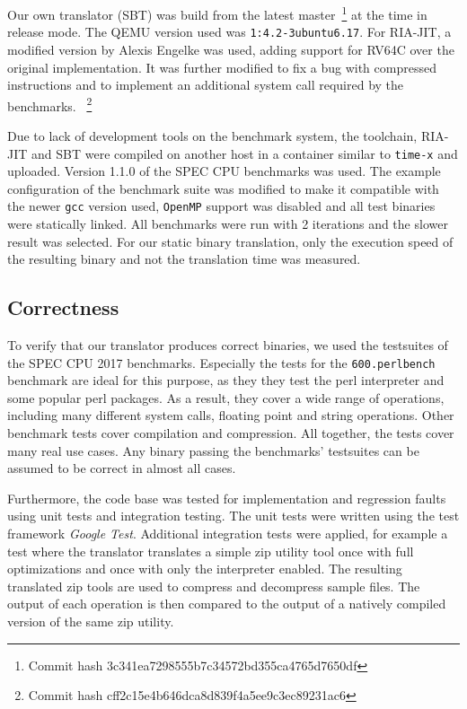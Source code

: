\documentclass[course=eragp]{aspdoc}
\begin{document}
Our own translator (SBT) was build from the latest master~\footnote{Commit hash 3c341ea7298555b7c34572bd355ca4765d7650df} at the time in release mode.
The QEMU version used was \texttt{1:4.2-3ubuntu6.17}.
For RIA-JIT, a modified version by Alexis Engelke was used, adding support for RV64C over the original implementation.
It was further modified to fix a bug with compressed instructions and to implement an additional system call required by the benchmarks.
~\footnote{Commit hash cff2c15e4b646dca8d839f4a5ee9c3ec89231ac6}

\par

Due to lack of development tools on the benchmark system, the toolchain,
RIA-JIT and SBT were compiled on another host in a container similar to \texttt{time-x} and uploaded. %
Version 1.1.0 of the SPEC CPU benchmarks was used.
The example configuration of the benchmark suite was modified to make
it compatible with the newer \texttt{gcc} version used, \texttt{OpenMP} support was disabled and all test binaries were statically linked.
All benchmarks were run with 2 iterations and the slower result was selected.
For our static binary translation, only the execution speed of the resulting binary and not the
translation time was measured.

\subsection{Correctness}

To verify that our translator produces correct binaries, we used the testsuites of the SPEC CPU 2017 benchmarks.
Especially the tests for the \texttt{600.perlbench} benchmark are ideal for this purpose,
as they they test the perl interpreter and some popular perl packages.
As a result, they cover a wide range of operations, including many different system calls,
floating point and string operations.
Other benchmark tests cover compilation and compression.
All together, the tests cover many real use cases. Any binary passing the benchmarks' testsuites can be assumed to be correct in almost all cases.

\par

Furthermore, the code base was tested for implementation and regression faults using unit tests and
integration testing. The unit tests were written using the test framework \textit{Google Test}.
Additional integration tests were applied, for example a test where the translator translates a
simple zip utility tool once with full optimizations and once with only the interpreter enabled. The
resulting translated zip tools are used to compress and decompress sample files. The output of each
operation is then compared to the output of a natively compiled version of the same zip utility.
\end{document}
